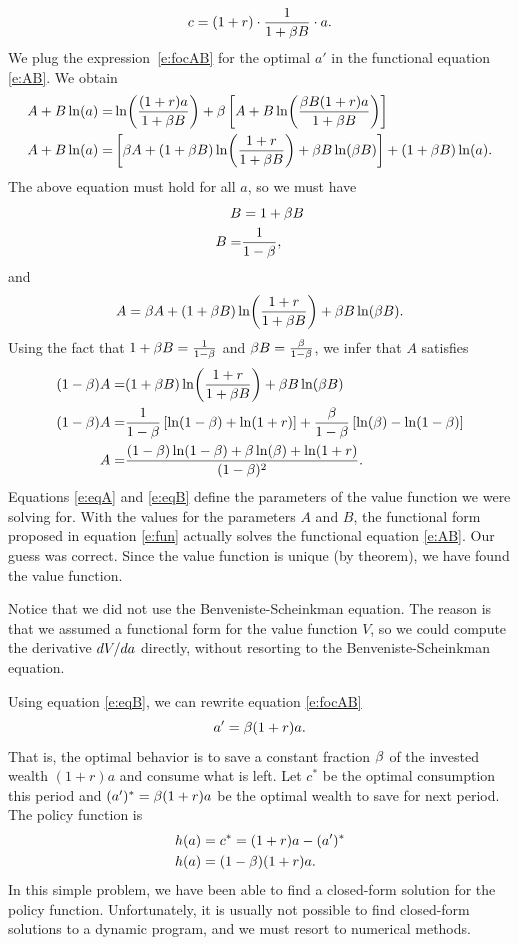 \documentclass[letterpaper, 11pt, leqno]{article}
\begin{document}
\begin{equation*}
c=(1+r)\cdot \frac{1}{1+\beta B} \cdot a. 
\end{equation*}
We plug the expression~\eqref{e:focAB} for the optimal $a'$ in the functional equation \eqref{e:AB}. We obtain
\begin{align*}
A+B \ln{a}=&\ln{\frac{(1+r) a}{1+\b B}}+\b \bs{A+B \ln{\frac{\b B (1+r) a}{1+\b B}}}\\
A+B \ln{a}=&\bs{\b A+ (1+\b B) \ln{\frac{1+r}{1+\b B}}+\b B \ln{\b B}} + (1+\b B) \ln{a}.
\end{align*}
The above equation must hold for all $a$, so we must have
\begin{align}
B&= 1+\beta B\nonumber\\
B=&\frac{1}{1-\beta}\label{e:eqB},
\end{align}
and
\begin{equation*}
A = \b A+(1+\b B) \ln{\frac{1+r}{1+\b B}}+\b B \ln{\b B}.
\end{equation*}
Using the fact that $1+\beta B=\frac{1}{1-\beta}$ and $\beta B=\frac{\beta}{1-\beta}$, we infer that $A$ satisfies
\begin{align}
(1-\b) A=&(1+\b B) \ln{\frac{1+r}{1+\b B}}+\b B \ln{\b B}\nonumber\\
(1-\b) A=&\frac{1}{1-\b} \bs{\ln{1-\b}+\ln{1+r}}+\frac{\b}{1-\b} \bs{\ln{\b}-\ln{1-\b}}\nonumber\\
A=&\frac{(1-\b) \ln{1-\b}+\b \ln{\b}+\ln{1+r}}{(1-\b)^2}\label{e:eqA}.
\end{align}
Equations \eqref{e:eqA} and \eqref{e:eqB} define the parameters of the value function we were solving for. With the values for the parameters $A$ and $B$, the functional form proposed in equation \eqref{e:fun} actually solves the functional equation \eqref{e:AB}. Our guess was correct. Since the value function is unique (by theorem), we have found the value function.

Notice that we did not use the Benveniste-Scheinkman equation. The reason is that we assumed a functional form for the value function $V$, so we could compute the derivative $\odx{V}{a}$ directly, without resorting to the Benveniste-Scheinkman equation.

Using equation \eqref{e:eqB}, we can rewrite equation \eqref{e:focAB}
\begin{equation*}
a'=\beta (1+r) a.
\end{equation*}
That is, the optimal behavior is to save a constant fraction $\beta$ of the invested wealth $(1+r) a$ and consume what is left. Let $c^{*}$ be the optimal consumption this period and $(a')^*=\beta (1+r) a $ be the optimal wealth to save for next period. The policy function is
\begin{align*}
h(a)&=c^*=(1+r) a-(a')^*\\
h(a)&=(1-\beta) (1+r) a.
\end{align*}
In this simple problem, we have been able to find a closed-form solution for the policy function. Unfortunately, it is usually not possible to find closed-form solutions to a dynamic program, and we must resort to numerical methods. 
\end{document}
